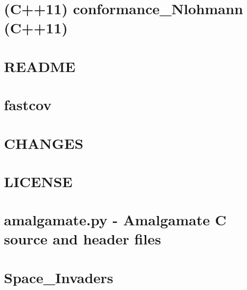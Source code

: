 \let\mypdfximage\pdfximage\def\pdfximage{\immediate\mypdfximage}\documentclass[twoside]{book}
\newcommand{\+}{\discretionary{\mbox{\scriptsize$\hookleftarrow$}}{}{}}
\begin{document}
\chapter{(C++11) conformance\+\_\+\+Nlohmann (C++11)}
\label{md_json-develop_test_reports_2016-09-09-nativejson_benchmark_conformance_Nlohmann_}

\chapter{R\+E\+A\+D\+ME}
\label{md_json-develop_test_reports_2016-09-09-nativejson_benchmark_README}

\chapter{fastcov}
\label{md_json-develop_test_thirdparty_fastcov_README}

\chapter{C\+H\+A\+N\+G\+ES}
\label{md_json-develop_third_party_amalgamate_CHANGES}

\chapter{L\+I\+C\+E\+N\+SE}
\label{md_json-develop_third_party_amalgamate_LICENSE}

\chapter{amalgamate.\+py -\/ Amalgamate C source and header files}
\label{md_json-develop_third_party_amalgamate_README}

\chapter{Space\+\_\+\+Invaders}
\label{md_README}

\end{document}
